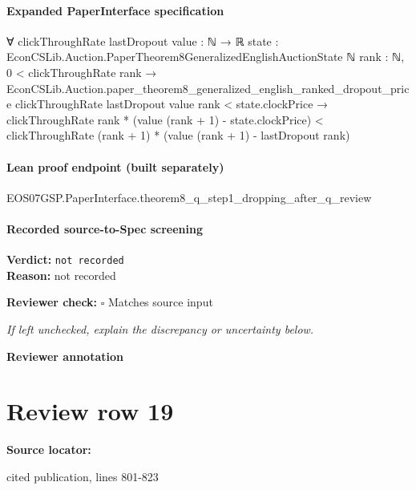 \documentclass[10pt]{article}
\newcommand{\reviewerbox}{%
  \par\noindent\fbox{\parbox{0.96\linewidth}{\rule{0pt}{0.38in}}}\par
}
\newcommand{\reviewmatch}[1]{%
  \par\noindent\textbf{Reviewer check:} $\square$\; #1\par
  \noindent\emph{If left unchecked, explain the discrepancy or uncertainty below.}\par
}
\begin{document}
\paragraph{Expanded PaperInterface specification}
\begin{ReviewVerbatim}
∀ {clickThroughRate lastDropout value : ℕ → ℝ} {state : EconCSLib.Auction.PaperTheorem8GeneralizedEnglishAuctionState ℕ}
  {rank : ℕ},
  0 < clickThroughRate rank →
    EconCSLib.Auction.paper_theorem8_generalized_english_ranked_dropout_price clickThroughRate lastDropout value rank <
        state.clockPrice →
      clickThroughRate rank * (value (rank + 1) - state.clockPrice) <
        clickThroughRate (rank + 1) * (value (rank + 1) - lastDropout rank)
\end{ReviewVerbatim}

\paragraph{Lean proof endpoint (built separately)}\begin{ReviewVerbatim}
EOS07GSP.PaperInterface.theorem8_q_step1_dropping_after_q_review
\end{ReviewVerbatim}

\paragraph{Recorded source-to-Spec screening}
\textbf{Verdict:} \texttt{not recorded}
\\
\textbf{Reason:} not recorded
\reviewmatch{Matches source input}
\noindent\textbf{Reviewer annotation}\par
\reviewerbox
\clearpage
\hypertarget{source-claim-630e42560fe176ef}{}
\section*{Review row 19}
\textbf{Source locator:} {\footnotesize\raggedright cited publication, lines 801-\allowbreak{}823\par}
\end{document}
